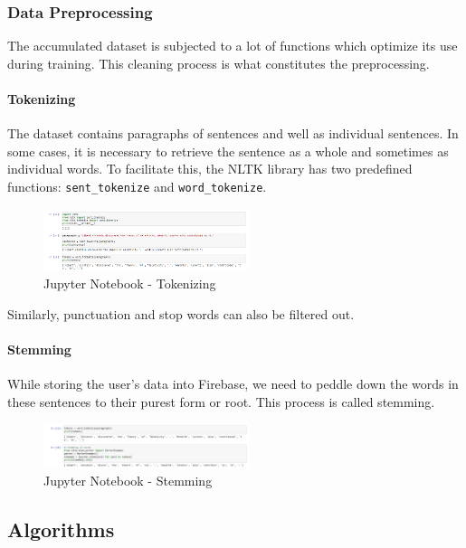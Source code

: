 \documentclass[conference,compsoc]{IEEEtran}
\begin{document}
\subsubsection{Data Preprocessing}

The accumulated dataset is subjected to a lot of functions which optimize its use during training. This cleaning process is what constitutes the preprocessing.

\paragraph{Tokenizing}
The dataset contains paragraphs of sentences and well as individual sentences. In some cases, it is necessary to retrieve the sentence as a whole and sometimes as individual words. To facilitate this, the NLTK library has two predefined functions: \texttt{sent\_tokenize} and \texttt{word\_tokenize}.

\begin{figure}[H]
    \centering
    \includegraphics[width=6cm]{images/jupyter-notebook-tokenizing.png}
    \caption{Jupyter Notebook - Tokenizing}
\end{figure}

Similarly, punctuation and stop words can also be filtered out.

\paragraph{Stemming}
While storing the user’s data into Firebase, we need to peddle down the words in these sentences to their purest form or root. This process is called stemming.

\begin{figure}[H]
    \centering
    \includegraphics[width=6cm]{images/jupyter-notebook-stemming.png}
    \caption{Jupyter Notebook - Stemming}
\end{figure}

\subsection{Algorithms}
\end{document}
